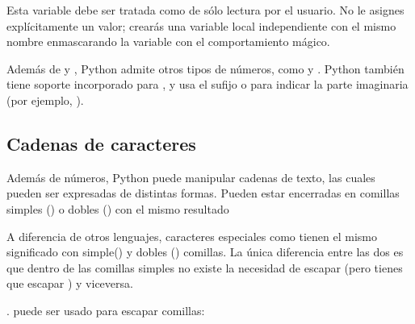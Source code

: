 \documentclass[a4,10pt,spanish]{sphinxmanual}
\begin{document}
\sphinxAtStartPar
Esta variable debe ser tratada como de sólo lectura por el usuario. No le asignes explícitamente un valor; crearás una variable local independiente con el mismo nombre enmascarando la variable con el comportamiento mágico.

\sphinxAtStartPar
Además de  y , Python admite otros tipos de números, como  y . Python también tiene soporte incorporado para , y usa el sufijo  o  para indicar la parte imaginaria (por ejemplo, ).


\subsection{Cadenas de caracteres}
\label{\detokenize{tutorial/introduction:strings}}\label{\detokenize{tutorial/introduction:tut-strings}}
\sphinxAtStartPar
Además de números, Python puede manipular cadenas de texto, las cuales pueden ser expresadas de distintas formas. Pueden estar encerradas en comillas simples () o dobles ()  con el mismo resultado %
\begin{footnote}[2]\sphinxAtStartFootnote
A diferencia de otros lenguajes, caracteres especiales como  tienen el mismo significado con simple() y dobles () comillas. La única diferencia entre las dos es que dentro de las comillas simples no existe la necesidad de escapar  (pero tienes que escapar ) y viceversa.
%
\end{footnote}.  \sphinxcode{\sphinxupquote{\textbackslash{}}} puede ser usado para escapar comillas:
\end{document}
